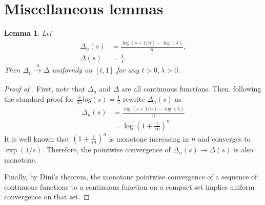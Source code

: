 \documentclass[a4paper]{article}
\newtheorem{lemma}{Lemma}
\begin{document}
\section{Miscellaneous lemmas}

\begin{lemma}
    \label{lemma:log_convergence}
    Let 
    \begin{align*}
        \Delta_n(s) &= \frac{\log(s + 1/n) - \log(\lambda)}{n}, \\
        \Delta(s) &= \frac{1}{s}.
    \end{align*}
    Then $\Delta_n \xrightarrow[]{\mathrm{u}} \Delta$ uniformly on $[t, 1]$ for any $t > 0, \lambda > 0$.
\end{lemma}
\begin{proof}[Proof of ]
    First, note that $\Delta_n$ and $\Delta$ are all continuous functions.
    Then, following the standard proof for $\frac{\mathrm{d}}{\mathrm{d}s}log(s) = \frac{1}{s}$ rewrite $\Delta_n(s)$ as
    \begin{align*}
        \Delta_n(s) &= \frac{\log(s + 1/n) - \log(\lambda)}{n} \\
        &= \log \left( 1 + \frac{1}{sn} \right) ^ n .
    \end{align*}
    It is well known that $\left( 1 + \frac{1}{sn} \right) ^ n$ is monotone increasing in $n$ and converges to $\exp (1/s)$.
    Therefore, the pointwise convergence of $\Delta_n(s) \to \Delta(s)$ is also monotone.

    Finally, by Dini's theorem, the monotone pointwise convergence of a sequence of continuous functions to a continuous function on a compact set implies uniform convergence on that set.
\end{proof}
\end{document}
